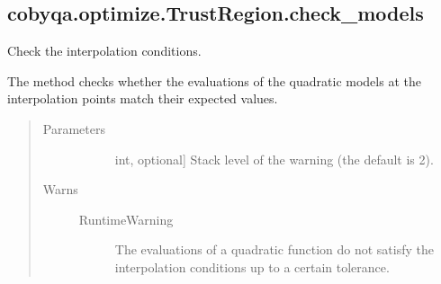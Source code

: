 \documentclass[letterpaper,10pt,english]{sphinxmanual}
\begin{document}
\begin{fulllineitems}
\begin{fulllineitems}
\begin{quote}
\begin{description}
\begin{description}
\end{description}

\end{description}\end{quote}

\end{fulllineitems}



\subsection{cobyqa.optimize.TrustRegion.check\_models}
\label{\detokenize{refs/generated/cobyqa.optimize.TrustRegion.check_models:cobyqa-optimize-trustregion-check-models}}\label{\detokenize{refs/generated/cobyqa.optimize.TrustRegion.check_models::doc}}

\begin{fulllineitems}
\label{\detokenize{refs/generated/cobyqa.optimize.TrustRegion.check_models:cobyqa.optimize.TrustRegion.check_models}}
\sphinxAtStartPar
Check the interpolation conditions.

\sphinxAtStartPar
The method checks whether the evaluations of the quadratic models at the
interpolation points match their expected values.
\begin{quote}\begin{description}
\item[{Parameters}] \leavevmode\begin{description}
\item[{}] \leavevmode{[}int, optional{]}
\sphinxAtStartPar
Stack level of the warning (the default is 2).

\end{description}

\item[{Warns}] \leavevmode\begin{description}
\item[{RuntimeWarning}] \leavevmode
\sphinxAtStartPar
The evaluations of a quadratic function do not satisfy the
interpolation conditions up to a certain tolerance.

\end{description}


\end{description}
\end{quote}
\end{fulllineitems}
\end{fulllineitems}
\end{document}
